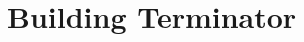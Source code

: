 \documentclass[10pt,compress]{beamer} %
\begin{document}
\section{Building Terminator}



\end{document}
